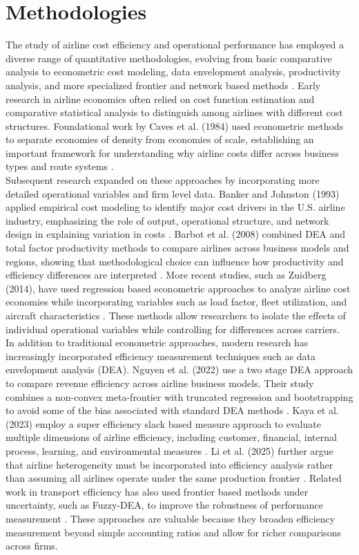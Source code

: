 \documentclass[11pt, letterpaper]{article}
\begin{document}
\section{Methodologies}
The study of airline cost efficiency and operational performance has employed a diverse range of quantitative methodologies, evolving from basic comparative analysis to econometric cost modeling, data envelopment analysis, productivity analysis, and more specialized frontier and network based methods \cite{Banker1993,Barbot2008,Caves1984,Li2025,Wanke2016}. Early research in airline economics often relied on cost function estimation and comparative statistical analysis to distinguish among airlines with different cost structures. Foundational work by Caves et al. (1984) used econometric methods to separate economies of density from economies of scale, establishing an important framework for understanding why airline costs differ across business types and route systems \cite{Caves1984}.\\
\indent Subsequent research expanded on these approaches by incorporating more detailed operational variables and firm level data. Banker and Johnston (1993) applied empirical cost modeling to identify major cost drivers in the U.S. airline industry, emphasizing the role of output, operational structure, and network design in explaining variation in costs \cite{Banker1993}. Barbot et al. (2008) combined DEA and total factor productivity methods to compare airlines across business models and regions, showing that methodological choice can influence how productivity and efficiency differences are interpreted \cite{Barbot2008}. More recent studies, such as Zuidberg (2014), have used regression based econometric approaches to analyze airline cost economies while incorporating variables such as load factor, fleet utilization, and aircraft characteristics \cite{Zuidberg2014}. These methods allow researchers to isolate the effects of individual operational variables while controlling for differences across carriers.\\
\indent In addition to traditional econometric approaches, modern research has increasingly incorporated efficiency measurement techniques such as data envelopment analysis (DEA). Nguyen et al. (2022) use a two stage DEA approach to compare revenue efficiency across airline business models. Their study combines a non-convex meta-frontier with truncated regression and bootstrapping to avoid some of the bias associated with standard DEA methods \cite{Nguyen2022,SIMAR1998,SIMAR2000}. Kaya et al. (2023) employ a super efficiency slack based measure approach to evaluate multiple dimensions of airline efficiency, including customer, financial, internal process, learning, and environmental measures \cite{KAYA2023}. Li et al. (2025) further argue that airline heterogeneity must be incorporated into efficiency analysis rather than assuming all airlines operate under the same production frontier \cite{Li2025}. Related work in transport efficiency has also used frontier based methods under uncertainty, such as Fuzzy-DEA, to improve the robustness of performance measurement \cite{Wanke2016}. These approaches are valuable because they broaden efficiency measurement beyond simple accounting ratios and allow for richer comparisons across firms.\\
\end{document}
